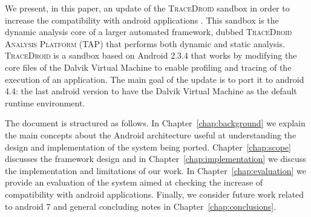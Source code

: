 We present, in this paper, an update of the \textsc{TraceDroid} sandbox in
order to increase the compatibility with android applications
\cite{ref1}. This sandbox is the dynamic analysis core of a larger
automated framework, dubbed \textsc{TraceDroid Analysis Platform (TAP)}
that performs both dynamic and static analysis. \textsc{TraceDroid} is a sandbox based on Android 2.3.4 that works
by modifying the core files of the Dalvik Virtual Machine to enable
profiling and tracing of the execution of an application. The
main goal of the update is to port it to android 4.4: the last android
version to have the Dalvik Virtual Machine as the default runtime
environment.

The document is structured as follows. In
Chapter~\ref{chap:background} we explain the main concepts about the
Android architecture useful at understanding the design and
implementation of the system being ported. Chapter~\ref{chap:scope}
discusses the framework design and in
Chapter~\ref{chap:implementation} we discuss the implementation and
limitations of our work. In Chapter~\ref{chap:evaluation} we provide
an evaluation of the system aimed at checking the increase of
compatibility with android applications. Finally, we consider future
work related to android 7 and general concluding notes in
Chapter~\ref{chap:conclusions}.
